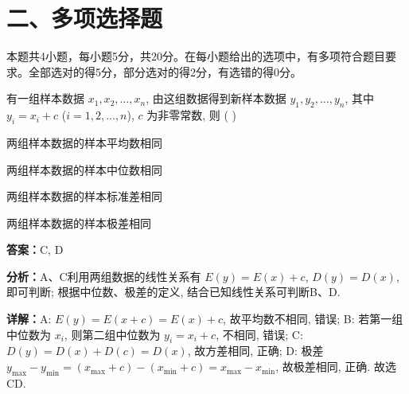 \section*{二、多项选择题}
本题共4小题，每小题5分，共20分。在每小题给出的选项中，有多项符合题目要求。全部选对的得5分，部分选对的得2分，有选错的得0分。

\begin{question}[points=5]
有一组样本数据 $x_1, x_2, \ldots, x_n$, 由这组数据得到新样本数据 $y_1, y_2, \ldots, y_n$, 其中 $y_i = x_i + c$ ($i = 1,2,\ldots,n$), $c$ 为非零常数, 则 ( )
\begin{choices}
  \item 两组样本数据的样本平均数相同
  \item 两组样本数据的样本中位数相同
  \item 两组样本数据的样本标准差相同
  \item 两组样本数据的样本极差相同
\end{choices}
\begin{solution}
\textbf{答案：}C, D

\textbf{分析：}A、C利用两组数据的线性关系有 $E(y) = E(x) + c$, $D(y) = D(x)$, 即可判断; 根据中位数、极差的定义, 结合已知线性关系可判断B、D.

\textbf{详解：}A: $E(y) = E(x+c) = E(x) + c$, 故平均数不相同, 错误; B: 若第一组中位数为 $x_i$, 则第二组中位数为 $y_i = x_i + c$, 不相同, 错误; C: $D(y) = D(x) + D(c) = D(x)$, 故方差相同, 正确; D: 极差 $y_{\max} - y_{\min} = (x_{\max} + c) - (x_{\min} + c) = x_{\max} - x_{\min}$, 故极差相同, 正确. 故选CD.
\end{solution}
\end{question}

